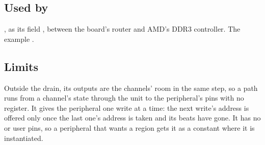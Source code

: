 \subsection*{Used by}

, as its field , between the board's router
and AMD's DDR3 controller. The example .

\subsection*{Limits}

Outside the drain, its  outputs are the channels' room in
the same step, so a path runs from a channel's state through the unit
to the peripheral's pins with no register. It gives the peripheral one
write at a time: the next write's address is offered only once the
last one's address is taken and its beats have gone. It has no
 or user pins, so a peripheral that wants a region gets
it as a constant where it is instantiated.
